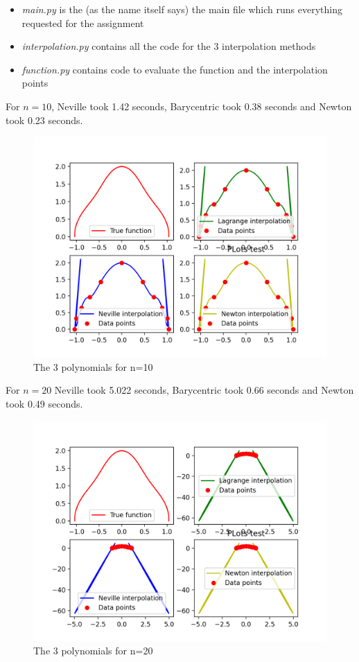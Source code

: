 \documentclass[12pt]{article}
\begin{document}
\begin{itemize}
	\item \textit{main.py} is the (as the name itself says) the main file which runs everything requested for the assignment
	\item \textit{interpolation.py} contains all the code for the 3 interpolation methods
	\item \textit{function.py} contains code to evaluate the function and the interpolation points
\end{itemize}


For $n=10$, Neville took 1.42 seconds, Barycentric took 0.38 seconds and Newton took 0.23 seconds. \\
\begin{figure}[h!]
	\centering
	\includegraphics[width=0.7\columnwidth]{n=10}
	\caption{The 3 polynomials for n=10}
\end{figure}

For $n=20$ Neville took 5.022 seconds, Barycentric took 0.66 seconds and Newton took 0.49 seconds. \\

\begin{figure}[h!]
	\centering
	\includegraphics[width=0.7\columnwidth]{n=20}
	\caption{The 3 polynomials for n=20}
\end{figure}
\end{document}
